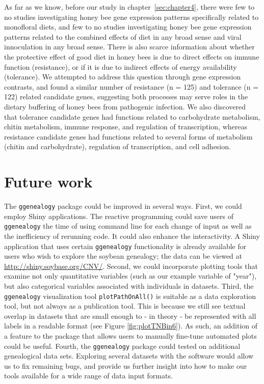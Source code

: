 \documentclass[11pt,a4paper,oldfontcommands,openany]{memoir}
\numberwithin{equation}{section} %
\newcommand{\code}[1]{{\texttt{#1}}}
\newcommand{\pkg}[1]{{\texttt{#1}}}
\begin{document}
As far as we know, before our study in chapter~\ref{sec:chapter4}, there were few to no studies investigating honey bee gene expression patterns specifically related to monofloral diets, and few to no studies investigating honey bee gene expression patterns related to the combined effects of diet in any broad sense and viral innoculation in any broad sense. There is also scarce information about whether the protective effect of good diet in honey bees is due to direct effects on immune function (resistance), or if it is due to indirect effects of energy availability (tolerance). We attempted to address this question through gene expression contrasts, and found a similar number of resistance (n = 125) and tolerance (n = 122) related candidate genes, suggesting both processes may serve roles in the dietary buffering of honey bees from pathogenic infection. We also discovered that tolerance candidate genes had functions related to carbohydrate metabolism, chitin metabolism, immune response, and regulation of transcription, whereas resistance candidate genes had functions related to several forms of metabolism (chitin and carbohydrate), regulation of transcription, and cell adhesion.

\section{Future work}

The \pkg{ggenealogy} package could be improved in several ways. First, we could employ Shiny applications. The reactive programming could save users of \pkg{ggenealogy} the time of using command line for each change of input as well as the inefficiency of rerunning code. It could also enhance the interactivity. A Shiny application that uses certain \pkg{ggenealogy} functionality is already available for users who wish to explore the soybean genealogy; the data can be viewed at \url{http://shiny.soybase.org/CNV/}. Second, we could incorporate plotting tools that examine not only quantitative variables (such as our example variable of "year"), but also categorical variables associated with individuals in datasets. Third, the \pkg{ggenealogy} visualization tool \code{plotPathOnAll()} is suitable as a data exploration tool, but not always as a publication tool. This is because we still see textual overlap in datasets that are small enough to - in theory - be represented with all labels in a readable format (see Figure \ref{fig:plotTNBin6}). As such, an addition of a feature to the package that allows users to manually fine-tune automated plots could be useful. Fourth, the \pkg{ggenealogy} package could tested on additional genealogical data sets. Exploring several datasets with the software would allow us to fix remaining bugs, and provide us further insight into how to make our tools available for a wide range of data input formats. 
\end{document}
